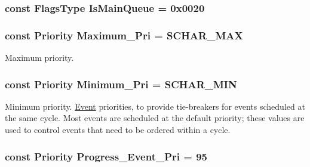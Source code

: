 \label{classEventBase_a9d51d37203d97fcdc8bc0141dfc00886}
\hypertarget{classEventBase_a3ab0ae5852588928a5c60a6543a3db49}{
\subsubsection[{IsMainQueue}]{\setlength{\rightskip}{0pt plus 5cm}const {\bf FlagsType} {\bf IsMainQueue} = 0x0020}}
\label{classEventBase_a3ab0ae5852588928a5c60a6543a3db49}
\hypertarget{classEventBase_a3cc4c3d1f4018e493e84809438c598b4}{
\subsubsection[{Maximum\_\-Pri}]{\setlength{\rightskip}{0pt plus 5cm}const {\bf Priority} {\bf Maximum\_\-Pri} = SCHAR\_\-MAX}}
\label{classEventBase_a3cc4c3d1f4018e493e84809438c598b4}


Maximum priority. \hypertarget{classEventBase_a3a053d2c68a342c1eac8399a161e388f}{
\subsubsection[{Minimum\_\-Pri}]{\setlength{\rightskip}{0pt plus 5cm}const {\bf Priority} {\bf Minimum\_\-Pri} = SCHAR\_\-MIN}}
\label{classEventBase_a3a053d2c68a342c1eac8399a161e388f}


Minimum priority. \hyperlink{classEvent}{Event} priorities, to provide tie-\/breakers for events scheduled at the same cycle. Most events are scheduled at the default priority; these values are used to control events that need to be ordered within a cycle. \hypertarget{classEventBase_a9bf11ac679214b1615b6280f5e4d2bd9}{
\subsubsection[{Progress\_\-Event\_\-Pri}]{\setlength{\rightskip}{0pt plus 5cm}const {\bf Priority} {\bf Progress\_\-Event\_\-Pri} = 95}}
\label{classEventBase_a9bf11ac679214b1615b6280f5e4d2bd9}


